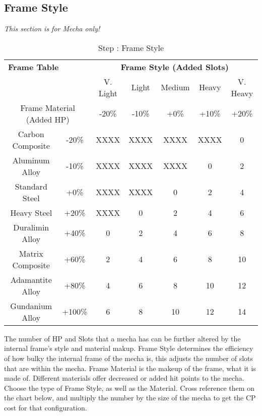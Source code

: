 \subsection{Frame Style }

\emph{This section is for Mecha only!}

\begin{table}[htb]
\begin{center}
\begin{tabular}{cc||c|c|c|c|c}
\hline
\multicolumn{2}{l}{\textbf{Frame Table}} &
\multicolumn{5}{c}{\textbf{Frame Style (Added Slots)}} \\
\multicolumn{2}{c}{} & V. Light & Light & Medium & Heavy & V. Heavy \\
\multicolumn{2}{c}{Frame Material (Added HP)} &
-20\% & -10\% & +0\% & +10\% & +20\% \\
\hline
\hline
Carbon Composite & -20\% & XXXX & XXXX & XXXX & XXXX & 0 \\ \hline
Aluminum Alloy & -10\% & XXXX & XXXX & XXXX & 0 & 2 \\ \hline
Standard Steel & +0\% & XXXX & XXXX & 0 & 2 & 4 \\ \hline
Heavy Steel & +20\% & XXXX & 0 & 2 & 4 & 6 \\ \hline
Duralimin Alloy & +40\% & 0 & 2 & 4 & 6 & 8 \\ \hline
Matrix Composite & +60\% & 2 & 4 & 6 & 8 & 10 \\ \hline
Adamantite Alloy & +80\% & 4 & 6 & 8 & 10 & 12 \\ \hline
Gundanium Alloy & +100\% & 6 & 8 & 10 & 12 & 14 \\ \hline
\end{tabular}
\caption{Step : Frame Style}
\end{center}
\end{table}
\addtocounter{MechaSteps}{1}

The number of HP and Slots that a mecha has can be further altered by the internal frame's style and material makup. Frame Style determines the efficiency of how bulky the internal frame of the mecha is, this adjusts the number of slots that are within the mecha. Frame Material is the makeup of the frame, what it is made of.  Different materials offer decreased or added hit points to the mecha. Choose the type of Frame Style, as well as the Material.  Cross reference them on the chart below, and multiply the number by the size of the mecha to get the CP cost for that configuration.

